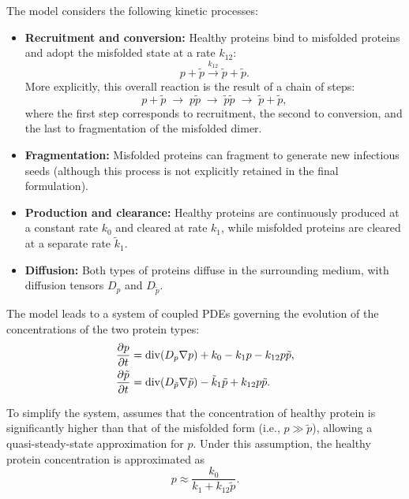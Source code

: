 \documentclass[12pt, a4paper, twoside, openright]{report}
\begin{document}
The model considers the following kinetic processes:
\begin{itemize}
  \item \textbf{Recruitment and conversion:} Healthy proteins bind to misfolded proteins and adopt the misfolded state at a rate $k_{12}$:
        \[
          p + \tilde{p} \xrightarrow{k_{12}} \tilde{p}+\tilde{p}.
        \]
        More explicitly, this overall reaction is the result of a chain of steps:
        \[
          p + \tilde{p} \;\to\; p\tilde{p} \;\to\; \tilde{p}\tilde{p} \;\to\; \tilde{p} + \tilde{p},
        \]
        where the first step corresponds to recruitment, the second to conversion, and the last to fragmentation of the misfolded dimer.

  \item \textbf{Fragmentation:} Misfolded proteins can fragment to generate new infectious seeds (although this process is not explicitly retained in the final formulation).

  \item \textbf{Production and clearance:} Healthy proteins are continuously produced at a constant rate $k_0$ and cleared at rate $k_1$, while misfolded proteins are cleared at a separate rate $\tilde{k}_1$.

  \item \textbf{Diffusion:} Both types of proteins diffuse in the surrounding medium, with diffusion tensors $D_p$ and $D_{\tilde{p}}$.
\end{itemize}

The model leads to a system of coupled PDEs governing the evolution of the concentrations of the two protein types:
\begin{align}
  \pdv{p}{t}         & = \operatorname{div}(D_p \nabla p) + k_0 - k_1 p - k_{12}p\tilde{p},                             \\
  \pdv{\tilde{p}}{t} & = \operatorname{div}(D_{\tilde{p}} \nabla \tilde{p}) - \tilde{k}_1 \tilde{p} + k_{12}p\tilde{p}.
\end{align}

To simplify the system, \cite{WEICKENMEIER2019264} assumes that the concentration of healthy protein is significantly higher than that of the misfolded form (i.e., $p \gg \tilde{p}$), allowing a quasi-steady-state approximation for $p$. Under this assumption, the healthy protein concentration is approximated as
\begin{equation}
  p \approx \frac{k_0}{k_1 + k_{12}\tilde{p}}.
\end{equation}
\end{document}
